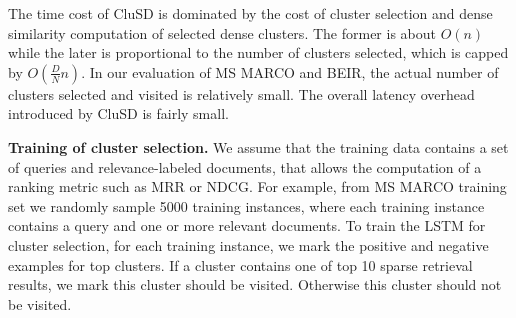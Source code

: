 The time  cost of CluSD is dominated by the cost of cluster selection and  dense similarity computation of selected dense clusters.
The former is about $O(n)$ while the later is
proportional to the number of clusters selected, which is capped by $O(\frac{D}{N} n)$. 
In  our evaluation of MS MARCO and BEIR, the actual number of clusters selected and visited is relatively small.
The overall latency overhead introduced by CluSD is fairly small. 





{\bf Training of cluster selection.} 
We assume that the training data  contains
a set of queries and relevance-labeled documents,  that allows the computation of a ranking metric such as MRR or NDCG.
For example, from MS MARCO training set we randomly sample 5000 training instances, where each training instance contains a query and  one or more  relevant documents. 
To train the LSTM for cluster selection, 
for each training instance, we mark the positive and negative examples for  top clusters.
If a cluster contains one of top 10 sparse retrieval results, we mark this cluster should be visited.
Otherwise this cluster should not be visited.

 

